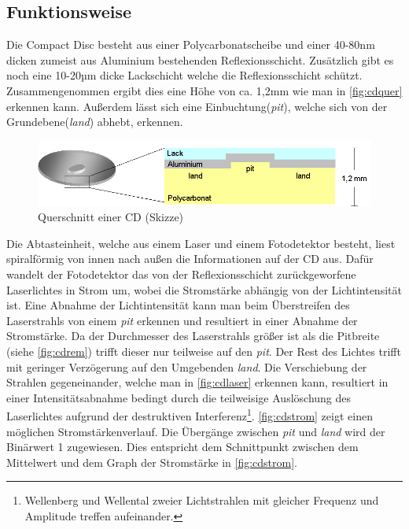 \subsection{Funktionsweise}
\label{subsec:cdfunktionsweise}

Die Compact Disc besteht aus einer Polycarbonatscheibe und einer 40-80nm dicken
zumeist aus Aluminium bestehenden Reflexionsschicht. Zusätzlich gibt es noch
eine 10-20µm dicke Lackschicht welche die Reflexionsschicht schützt.
Zusammengenommen ergibt dies eine Höhe von ca. 1,2mm wie man in
\autoref{fig:cdquer} erkennen kann. Außerdem lässt sich eine
Einbuchtung(\textit{pit}), welche sich von der Grundebene(\textit{land}) abhebt,
erkennen. \cite{cfcd}

\begin{figure}[h]
  \begin{center}
      \begin{minipage}[t]{\textwidth}
        \begin{center}
            \includegraphics[height=0.1\textheight]{Bilder/Optische_Datentraeger_Die_Compact_Disc/Funktionsweise/cdquer.png}
            \caption[Querschnitt einer CD (Skizze) \newline \url{http://daten.didaktikchemie.uni-bayreuth.de/umat/cd_dvd/cd_dvd.htm} (zuletzt aufgerufen am 07.08.2015)]{Querschnitt einer CD (Skizze)}
            \label{fig:cdquer}
        \end{center}
      \end{minipage}
  \end{center}
\end{figure}

Die Abtasteinheit, welche aus einem Laser und einem Fotodetektor besteht, liest
spiralförmig von innen nach außen die Informationen auf der CD aus. Dafür
wandelt der Fotodetektor das von der Reflexionsschicht zurückgeworfene
Laserlichtes in Strom um, wobei die Stromstärke abhängig von der Lichtintensität
ist. Eine Abnahme der Lichtintensität kann man beim Überstreifen des
Laserstrahls von einem \textit{pit} erkennen und resultiert in einer Abnahme der
Stromstärke. Da der Durchmesser des Laserstrahls größer ist als die Pitbreite
(siehe \autoref{fig:cdrem}) trifft dieser nur teilweise auf den \textit{pit}.
Der Rest des Lichtes trifft mit geringer Verzögerung auf den Umgebenden
\textit{land}. Die Verschiebung der Strahlen gegeneinander, welche man in
\autoref{fig:cdlaser} erkennen kann, resultiert in einer Intensitätsabnahme
bedingt durch die teilweisige Auslöschung des Laserlichtes aufgrund der
destruktiven Interferenz\footnote{Wellenberg und Wellental zweier Lichtstrahlen
mit gleicher Frequenz und Amplitude treffen aufeinander.}. \autoref{fig:cdstrom}
zeigt einen möglichen Stromstärkenverlauf. Die Übergänge zwischen \textit{pit}
und \textit{land} wird der Binärwert 1 zugewiesen. Dies entspricht dem
Schnittpunkt zwischen dem Mittelwert und dem Graph der Stromstärke in
\autoref{fig:cdstrom}. \cite{cdp}

